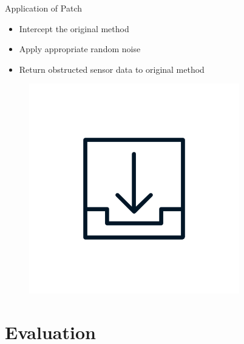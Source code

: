 \documentclass[aspectratio=169]{beamer}
[aspectratio=169] %
\begin{document}
\begin{frame}{Application of Patch}
  \begin{minipage}{0.49\textwidth} 
    \begin{itemize}
      \item Intercept the original method
      \pause
      \item Apply appropriate random noise
      \pause
      \item Return obstructed sensor data to original method
    \end{itemize}
  \end{minipage}
  \hfill
  \begin{minipage}{0.49\textwidth} 
    \begin{figure}
      \centering
      \includegraphics[height=0.5\textheight]{figures/download.png}
    \end{figure}
  \end{minipage}
\end{frame}


\section{Evaluation}
\end{document}
